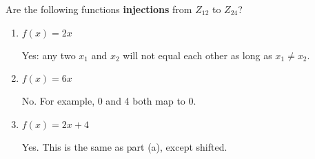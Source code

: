 \question Are the following functions \textbf{injections} 
from $Z_{12}$ to $Z_{24}$?
\begin{enumerate}[label=\alph*.]
\item $f(x) = 2x$
\begin{solution}[0.2 in]
Yes: any two $x_1$ and $x_2$ will not equal each other as long as 
$x_1 \neq x_2$. 
\end{solution}

\item $f(x) = 6x$
\begin{solution}[0.2 in]
No. For example, 0 and 4 both map to 0.
\end{solution}

\item $f(x) = 2x + 4$
\begin{solution}[0.2 in]
Yes. This is the same as part (a), except shifted. 
\end{solution}
\end{enumerate}